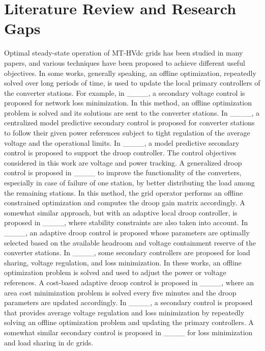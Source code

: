 \section{Literature Review and Research Gaps}
Optimal steady-state operation of MT-HVdc grids has been studied in many papers, and various techniques have been proposed to achieve different useful objectives.
In some works, generally speaking, an offline optimization, repeatedly solved over long periods of time, is used to update the local primary controllers of the converter stations.
For example, in ____, a secondary voltage control is proposed for network loss minimization. In this method, an offline optimization problem is solved and its solutions are sent to the converter stations.
In ____, a centralized model predictive secondary control is proposed for converter stations to follow their given power references subject to tight regulation of the average voltage and the operational limits.
In ____, a model predictive secondary control is proposed to support the droop controller. The control objectives considered in this work are voltage and power tracking.
A generalized droop control is proposed in ____ to improve the functionality of the converters, especially in case of failure of one station, by better distributing the load among the remaining stations. In this method, the grid operator performs an offline constrained optimization and computes the droop gain matrix accordingly. A somewhat similar approach, but with an adaptive local droop controller, is proposed in ____, where stability constraints are also taken into account.
In ____, an adaptive droop control is proposed whose parameters are optimally selected based on the available headroom and voltage containment reserve of the converter stations.
In ____, some secondary controllers are proposed for load sharing, voltage regulation, and loss minimization. In these works, an offline optimization problem is solved and used to adjust the power or voltage references.
A cost-based adaptive droop control is proposed in ____, where an area cost minimization problem is solved every five minutes and the droop parameters are updated accordingly.
In ____, a secondary control is proposed that provides average voltage regulation and loss minimization by repeatedly solving an offline optimization problem and updating the primary controllers.
A somewhat similar secondary control is proposed in ____ for loss minimization and load sharing in dc grids.


